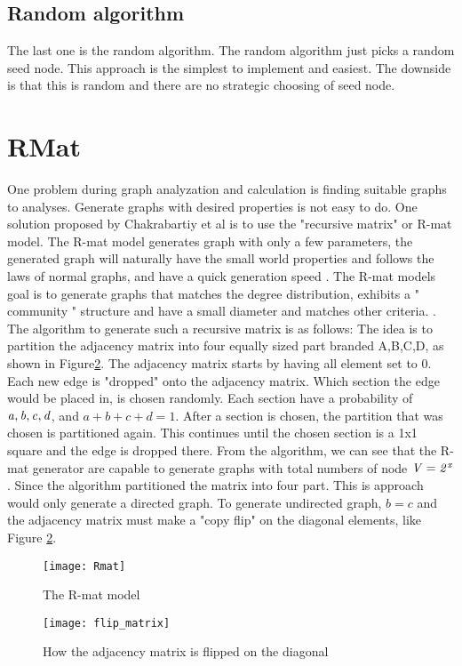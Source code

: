 {\subsection{Random algorithm}
The last one is the random algorithm. The random algorithm just picks a random seed node. This approach is the simplest to implement and easiest. The downside is that this is random and there are no strategic choosing of seed node. 

\section{RMat}
One problem during graph analyzation and calculation is finding suitable graphs to analyses. Generate graphs with desired properties is not easy to do. One solution proposed by Chakrabartiy et al is to use the "recursive matrix" or R-mat model. The R-mat model generates graph with only a few parameters, the generated graph will naturally have the small world properties and follows the laws of normal graphs, and have a quick generation speed \cite{Rmat2004}. The R-mat models goal is to generate graphs that matches the degree distribution, exhibits a " community " structure and have a small diameter and matches other criteria. \cite{Rmat2004}. The algorithm to generate such a recursive matrix is as follows: The idea is to partition the adjacency matrix into four equally sized part branded A,B,C,D, as shown in Figure\ref{fig:flipDiagonal}. The adjacency matrix starts by having all element set to 0. Each new edge is "dropped" onto the adjacency matrix. Which section the edge would be placed in, is chosen randomly. Each section have a probability of $\it{a, b, c, d}$, and $a + b + c + d = 1$. After a section is chosen, the partition that was chosen is partitioned again. This continues until the chosen section is a 1x1 square and the edge is dropped there. From the algorithm, we can see that the R-mat generator are capable to generate graphs with total numbers of node $ \it{V} = 2^x$. Since the algorithm partitioned the matrix into four part. This is approach would only generate a directed graph. To generate undirected graph, $b = c$ and the adjacency matrix must make a "copy flip" on the diagonal elements, like Figure \ref{fig:flipDiagonal}. 


\begin{figure}
\texttt{[image: Rmat]}
\caption{The R-mat model \cite{Rmat2004}}
\label{fig:Rmat}
\end{figure}

\begin{figure}
\texttt{[image: flip\_matrix]}
\caption{How the adjacency matrix is flipped on the diagonal}
\label{fig:flipDiagonal}


\end{figure}}
